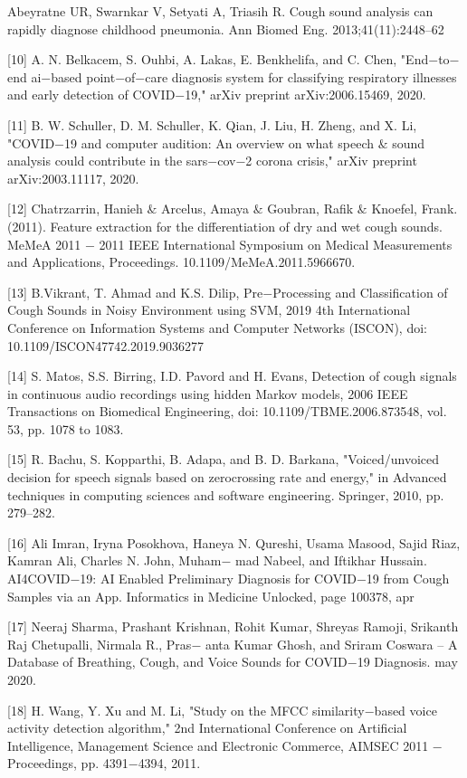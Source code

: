 \documentclass[11pt]{article}
\begin{document}
\begin{itemize}
[9] Abeyratne UR, Swarnkar V, Setyati A, Triasih R. Cough sound analysis can rapidly diagnose childhood pneumonia. Ann Biomed Eng. 2013;41(11):2448–62

[10] A. N. Belkacem, S. Ouhbi, A. Lakas, E. Benkhelifa, and C. Chen, "End$-$to$-$end ai$-$based point$-$of$-$care diagnosis system for classifying respiratory illnesses and early detection of COVID$-$19," arXiv preprint arXiv:2006.15469, 2020.

[11] B. W. Schuller, D. M. Schuller, K. Qian, J. Liu, H. Zheng, and X. Li, "COVID$-$19 and computer audition: An overview on what speech $\&$ sound analysis could contribute in the sars$-$cov$-$2 corona crisis," arXiv preprint arXiv:2003.11117, 2020.

[12] Chatrzarrin, Hanieh $\&$ Arcelus, Amaya $\&$ Goubran, Rafik $\&$ Knoefel, Frank. (2011). Feature extraction for the differentiation of dry and wet cough sounds. MeMeA 2011 $-$ 2011 IEEE International Symposium on Medical Measurements and Applications, Proceedings. 10.1109/MeMeA.2011.5966670.

[13] B.Vikrant, T. Ahmad and K.S. Dilip, Pre$-$Processing and Classification of Cough Sounds in Noisy Environment using SVM, 2019 4th International Conference on Information Systems and Computer Networks (ISCON), doi: 10.1109/ISCON47742.2019.9036277

[14] S. Matos, S.S. Birring, I.D. Pavord and H. Evans, Detection of cough signals in continuous audio recordings using hidden Markov models, 2006 IEEE Transactions on Biomedical Engineering, doi: 10.1109/TBME.2006.873548, vol. 53, pp. 1078 to 1083.

[15] R. Bachu, S. Kopparthi, B. Adapa, and B. D. Barkana, "Voiced/unvoiced decision for speech signals based on zerocrossing rate and energy," in Advanced techniques in computing sciences and software engineering. Springer, 2010, pp. 279–282. 

[16] Ali Imran, Iryna Posokhova, Haneya N. Qureshi, Usama Masood, Sajid Riaz, Kamran Ali, Charles N. John, Muham$-$ mad Nabeel, and Iftikhar Hussain. AI4COVID$-$19: AI Enabled Preliminary Diagnosis for COVID$-$19 from Cough Samples via an App. Informatics in Medicine Unlocked, page 100378, apr

[17] Neeraj Sharma, Prashant Krishnan, Rohit Kumar, Shreyas Ramoji, Srikanth Raj Chetupalli, Nirmala R., Pras$-$ anta Kumar Ghosh, and Sriram Coswara – A Database of Breathing, Cough, and Voice Sounds for COVID$-$19 Diagnosis. may 2020.

[18] H. Wang, Y. Xu and M. Li, "Study on the MFCC similarity$-$based voice activity detection algorithm," 2nd International Conference on Artificial Intelligence, Management Science and Electronic Commerce, AIMSEC 2011 $-$ Proceedings, pp. 4391$-$4394, 2011.


\end{itemize}
\end{document}
